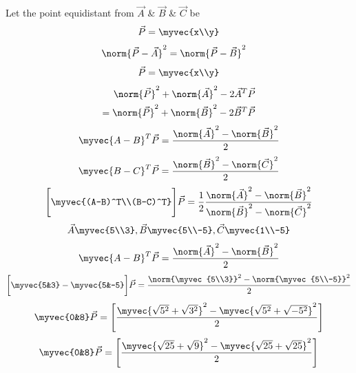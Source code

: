 \documentclass[journal,12pt,twocolumn]{IEEEtran}
\begin{document}
Let the point equidistant from $\Vec{A}$ \& $\Vec{B}$ \& $\Vec{C}$ be 
\begin{align}
    \Vec{P}=\myvec{x\\y}
\end{align}
\begin{align}
    \norm{\Vec{P}-\vec{A}}^2 &= \norm{\vec{P}-\vec{B}}^2
\end{align}
\begin{align}
        \Vec{P}=\myvec{x\\y}
    \end{align}
\begin{align}
    \norm{\vec{P}}^2 + \norm{\vec{A}}^2 -2\vec{A}^T\vec{P}\\ = \norm{\vec{P}}^2 + \norm{\vec{B}}^2 -2\vec{B}^T\vec{P}
\end{align}
\begin{align}
    \myvec{A-B}^T\vec{P} = \frac{\norm{\vec{A}}^2-\norm{\vec{B}}^2}{{2}}
\end{align}
\begin{align}
    \myvec{B-C}^T\vec{P} = \frac{\norm{\vec{B}}^2-\norm{\vec{C}}^2}{{2}}
\end{align}
\begin{align}
   \Bigg[\myvec{(A-B)^T\\(B-C)^T}\Bigg] \vec{P} = \frac{1}{2}\frac{\norm{\vec{A}}^2-\norm{\vec{B}}^2}{\norm{\vec{B}}^2-\norm{\vec{C}}^2}
\end{align}
\begin{align}
    \Vec{A}\myvec{5\\3},\Vec{B}\myvec{5\\-5},\Vec{C}\myvec{1\\-5}    \end{align}
\begin{align}
    \myvec{A-B}^T\vec{P} = \frac{\norm{\vec{A}}^2-\norm{\vec{B}}^2}{{2}}
\end{align} 
\begin{align}
    \bigg[\myvec{5&3} - \myvec{5&-5}\bigg]\vec{P}= \frac{\norm{\myvec{5\\3}}^2-\norm{\myvec{5\\-5}}^2}{2}
\end{align}
    \begin{align}
        \myvec{0&8}\vec{P}=\Bigg[\frac{\myvec{\sqrt{5^2}+\sqrt{3^2}}^2 -\myvec{\sqrt{5^2}+\sqrt{-5^2}}^2}{2}\Bigg]
    \end{align}
    \begin{align}
        \myvec{0&8}\vec{P}=\Bigg[\frac{\myvec{\sqrt{25}+\sqrt{9}}^2 -\myvec{\sqrt{25}+\sqrt{25}}^2}{2}\Bigg]
    \end{align}
\end{document}
